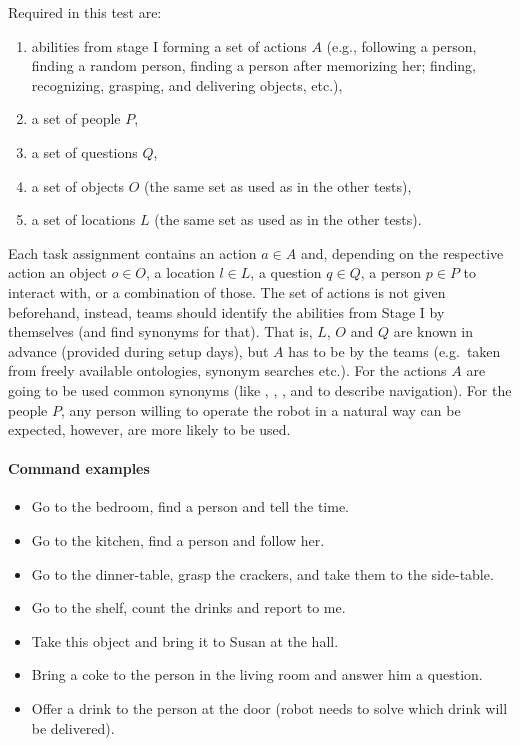 Required in this test are:
\begin{enumerate}
	\item abilities from stage I forming a set of actions $A$ (e.g., following a person, finding a random person, finding a person after memorizing her; finding, recognizing, grasping, and delivering objects, etc.),
	\item a set of people $P$,
	\item a set of questions $Q$,
	\item a set of objects $O$ (the same set as used as in the other tests),
	\item a set of locations $L$ (the same set as used as in the other tests).
\end{enumerate}

Each task assignment contains an action $a \in A$ and, depending on the respective action an object $o \in O$, a location $l \in L$, a question $q \in Q$, a person $p \in P$ to interact with, or a combination of those. The set of actions is not given beforehand, instead, teams should identify the abilities from Stage I by themselves (and find synonyms for that). That is, $L$, $O$ and $Q$ are known in advance (provided during setup days), but $A$ has to be  by the teams (e.g.~taken from freely available ontologies, synonym searches etc.). For the actions $A$ are going to be used common synonyms (like , , , and  to describe navigation). For the people $P$, any person willing to operate the robot in a natural way can be expected, however,  are more likely to be used.

\paragraph{Command examples}
\begin{itemize}
	\item Go to the bedroom, find a person and tell the time.
	\item Go to the kitchen, find a person and follow her.
	\item Go to the dinner-table, grasp the crackers, and take them to the side-table.
	\item Go to the shelf, count the drinks and report to me.
	\item Take this object and bring it to Susan at the hall.
	\item Bring a coke to the person in the living room and answer him a question.
	\item Offer a drink to the person at the door (robot needs to solve which drink will be delivered).
\end{itemize}


